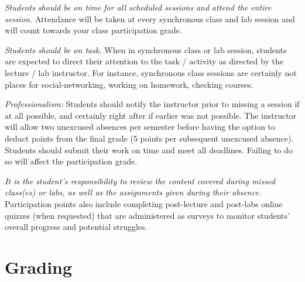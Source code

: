 \documentclass[12pt]{scrartcl}
\newcommand{\change}[2]{#2}
\begin{document}
\textit{Students should be on time for all scheduled sessions and attend the entire session.} 
Attendance will be taken at every \change{}{synchronous class and lab} session \change{(at first you will have to sign in but as time goes the instructor will know you and mark you present without your help)} and will count towards your class participation grade. 

\textit{Students should be on task.} 
When in \change{lecture}{synchronous class} or lab session, students are expected to direct their attention to the task / activity as directed by the lecture / lab instructor. 
For instance, \change{lecture and lab}{synchronous class} sessions are certainly not places for social-networking, working on homework, checking courses.

\textit{Professionalism:} 
Students should notify the instructor prior to missing a session if at all possible, and certainly right after if earlier was not possible. 
The instructor will allow two unexcused absences per semester before having the option to deduct points from the final grade (5 points per subsequent unexcused absence). 
Students should submit their work on time and meet all deadlines. Failing to do so will affect the participation grade.

\textit{It is the student's responsibility to \change{obtain}{review} the content covered during missed class(es) or labs, as well as the assignments given during their absence.} 
Participation points also include completing post-lecture and post-labs online quizzes (when requested) that are administered as surveys to monitor students’ overall progress and potential struggles.


\section{Grading}
\end{document}
